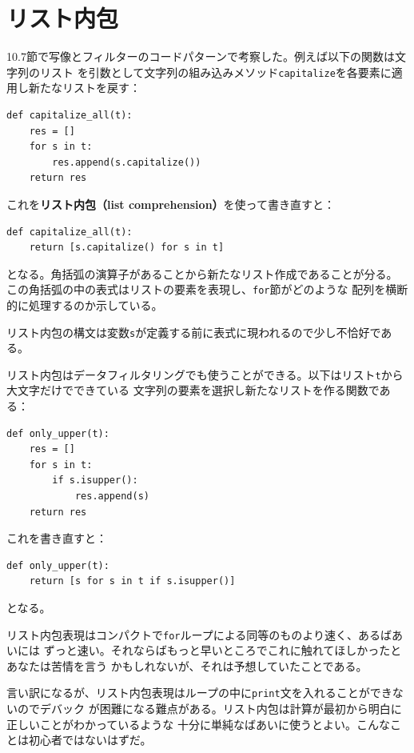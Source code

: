 \documentclass[a4j,12pt,makeidx]{jbook}
\begin{document}
\section{リスト内包}
10.7節で写像とフィルターのコードパターンで考察した。例えば以下の関数は文字列のリスト
を引数として文字列の組み込みメソッド{\tt capitalize}を各要素に適用し新たなリストを戻す：
\begin{verbatim}
def capitalize_all(t):
    res = []
    for s in t:
        res.append(s.capitalize())
    return res
\end{verbatim}
これを{\bf リスト内包（list comprehension）}を使って書き直すと：
\begin{verbatim}
def capitalize_all(t):
    return [s.capitalize() for s in t]
\end{verbatim}
となる。角括弧の演算子があることから新たなリスト作成であることが分る。
この角括弧の中の表式はリストの要素を表現し、{\tt for}節がどのような
配列を横断的に処理するのか示している。\par
リスト内包の構文は変数{\tt s}が定義する前に表式に現われるので少し不恰好である。\par
リスト内包はデータフィルタリングでも使うことができる。以下はリスト{\tt t}から大文字だけでできている
文字列の要素を選択し新たなリストを作る関数である：
\begin{verbatim}
def only_upper(t):
    res = []
    for s in t:
        if s.isupper():
            res.append(s)
    return res
\end{verbatim}
これを書き直すと：
\begin{verbatim}
def only_upper(t):
    return [s for s in t if s.isupper()]
\end{verbatim}
となる。\par
リスト内包表現はコンパクトで{\tt for}ループによる同等のものより速く、あるばあいには
ずっと速い。それならばもっと早いところでこれに触れてほしかったとあなたは苦情を言う
かもしれないが、それは予想していたことである。\par
言い訳になるが、リスト内包表現はループの中に{\tt print}文を入れることができないのでデバック
が困難になる難点がある。リスト内包は計算が最初から明白に正しいことがわかっているような
十分に単純なばあいに使うとよい。こんなことは初心者ではないはずだ。
%
\end{document}
